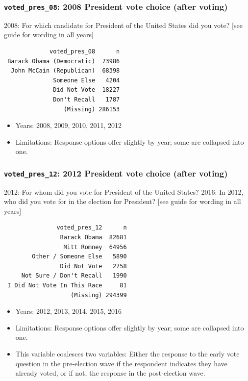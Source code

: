 \documentclass[10pt,article,oneside]{memoir}
\theoremstyle{definition}
\begin{document}
\subsubsection{\texorpdfstring{\texttt{voted\_pres\_08}: 2008 President
vote choice (after
voting)}{voted\_pres\_08: 2008 President vote choice (after voting)}}\label{voted_pres_08-2008-president-vote-choice-after-voting}

2008: For which candidate for President of the United States did you
vote? {[}see guide for wording in all years{]}

\begin{verbatim}
             voted_pres_08      n
 Barack Obama (Democratic)  73986
  John McCain (Republican)  68398
              Someone Else   4204
              Did Not Vote  18227
              Don't Recall   1787
                 (Missing) 286153
\end{verbatim}

\begin{itemize}
\tightlist
\item
  Years: 2008, 2009, 2010, 2011, 2012
\item
  Limitations: Response options offer slightly by year; some are
  collapsed into one.
\end{itemize}

\subsubsection{\texorpdfstring{\texttt{voted\_pres\_12}: 2012 President
vote choice (after
voting)}{voted\_pres\_12: 2012 President vote choice (after voting)}}\label{voted_pres_12-2012-president-vote-choice-after-voting}

2012: For whom did you vote for President of the United States? 2016: In
2012, who did you vote for in the election for President? {[}see guide
for wording in all years{]}

\begin{verbatim}
               voted_pres_12      n
                Barack Obama  82681
                 Mitt Romney  64956
        Other / Someone Else   5890
                Did Not Vote   2758
     Not Sure / Don't Recall   1990
 I Did Not Vote In This Race     81
                   (Missing) 294399
\end{verbatim}

\begin{itemize}
\tightlist
\item
  Years: 2012, 2013, 2014, 2015, 2016
\item
  Limitations: Response options offer slightly by year; some are
  collapsed into one.
\item
  This variable coalesces two variables: Either the response to the
  early vote question in the pre-election wave if the respondent
  indicates they have already voted, or if not, the response in the
  post-election wave.
\end{itemize}
\end{document}
